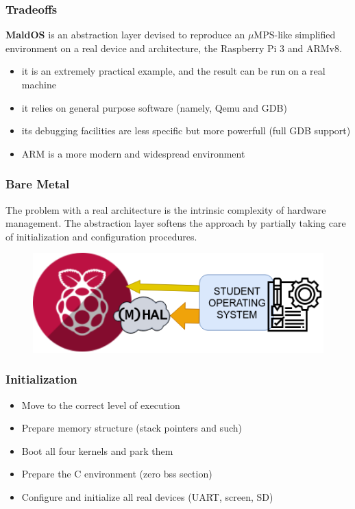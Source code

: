 \documentclass[table,xcdraw]{beamer}
\begin{document}
\begin{frame}
    \frametitle{Tradeoffs}
    \textbf{MaldOS} is an abstraction layer devised to reproduce an $\mu$MPS-like simplified
    environment on a real device and architecture, the Raspberry Pi 3 and ARMv8.
    \begin{itemize}
        \item it is an extremely practical example, and the result can be run on a real machine
        \item it relies on general purpose software (namely, Qemu and GDB)
        \item its debugging facilities are less specific but more powerfull (full GDB support)
        \item ARM is a more modern and widespread environment
    \end{itemize}

\end{frame}

\begin{frame}
    \frametitle{Bare Metal}
    The problem with a real architecture is the intrinsic complexity of hardware
    management. The abstraction layer softens the approach by partially taking care 
    of initialization and configuration procedures.
    \begin{figure}[b]
    \includegraphics[scale=0.7]{raspberrypi.png}
    \end{figure}
\end{frame}

\begin{frame}
    \frametitle{Initialization}
    \begin{itemize}
        \item Move to the correct level of execution
        \item Prepare memory structure (stack pointers and such)
        \item Boot all four kernels and park them
        \item Prepare the C environment (zero bss section)
        \item Configure and initialize all real devices (UART, screen, SD)
    \end{itemize}
\end{frame}
\end{document}
